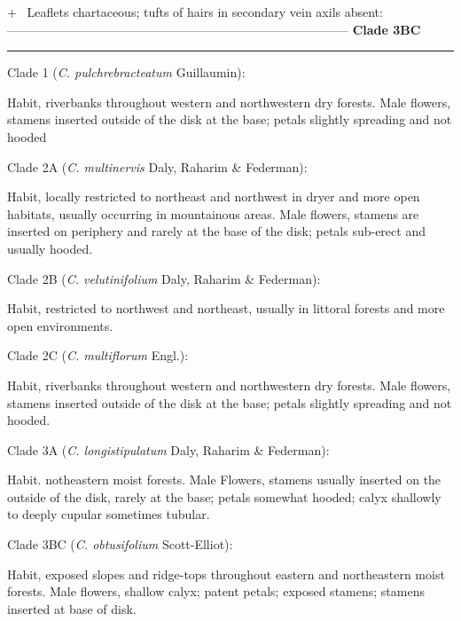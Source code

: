 \documentclass[10pt,letterpaper]{article}
\begin{document}
+~ Leaflets chartaceous; tufts of hairs in secondary vein axils absent: ----------------------------------------------------------------------------------- {\bf Clade 3BC}

\noindent\rule{12cm}{0.4pt}
\vspace{5mm}

\noindent Clade 1 (\emph{C. pulchrebracteatum} Guillaumin):  

Habit, riverbanks throughout western and northwestern dry forests.  Male flowers, stamens inserted outside of the disk at the base; petals slightly spreading and not hooded
\vspace{5mm}


\noindent Clade 2A (\emph{C. multinervis} Daly, Raharim \& Federman):  

Habit, locally restricted to northeast and northwest in dryer and more open habitats, usually occurring in mountainous areas. Male flowers, stamens are inserted on periphery and rarely at the base of the disk; petals sub-erect and usually hooded.
\vspace{5mm}


\noindent Clade 2B (\emph{C. velutinifolium} Daly, Raharim \& Federman):  

Habit, restricted to northwest and northeast, usually in littoral forests and more open environments.
\vspace{5mm}

\noindent Clade 2C (\emph{C. multiflorum} Engl.):  

Habit, riverbanks throughout western and northwestern dry forests.  Male flowers, stamens inserted outside of the disk at the base; petals slightly spreading and not hooded.
\vspace{5mm}

\noindent Clade 3A (\emph{C. longistipulatum} Daly, Raharim \& Federman):  

Habit. notheastern moist forests. Male Flowers, stamens usually inserted on the outside of the disk, rarely at the base; petals somewhat hooded; calyx shallowly to deeply cupular sometimes tubular.
\vspace{5mm}

\noindent Clade 3BC (\emph{C. obtusifolium} Scott-Elliot):  

Habit, exposed slopes and ridge-tops throughout eastern and northeastern moist forests. Male flowers, shallow calyx; patent petals; exposed stamens; stamens inserted at base of disk.
\vspace{5mm}
\end{document}
